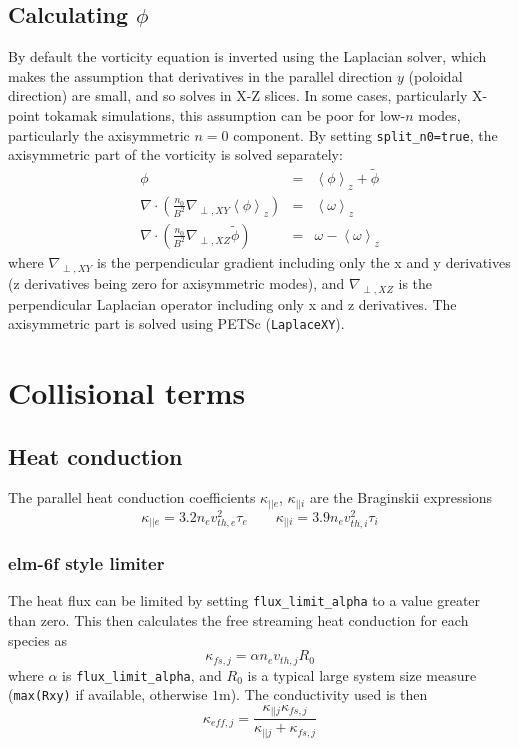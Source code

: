 \documentclass[12pt,a4paper]{article}
\begin{document}
\subsection{Calculating $\phi$}

By default the vorticity equation is inverted using the Laplacian solver, 
which makes the assumption that derivatives in the parallel direction $y$
(poloidal direction) are small, and so solves in X-Z slices. 
In some cases, particularly X-point tokamak simulations, this assumption
can be poor for low-$n$ modes, particularly the axisymmetric $n=0$ component.
By setting \texttt{split\_n0=true}, the axisymmetric part of the vorticity is solved separately:
\begin{eqnarray}
\phi &=& \left<\phi\right>_z + \tilde{\phi} \\
\nabla\cdot\left(\frac{n_0}{B^2}\nabla_{\perp, XY}\left<\phi\right>_z\right) &=& \left<\omega\right>_z \\
\nabla\cdot\left(\frac{n_0}{B^2}\nabla_{\perp, XZ}\tilde{\phi}\right) &=& \omega - \left<\omega\right>_z
\end{eqnarray}
where $\nabla_{\perp, XY}$ is the perpendicular gradient including only the x and y derivatives (z derivatives being zero for axisymmetric modes), 
and $\nabla_{\perp, XZ}$ is the perpendicular Laplacian operator including only x and z derivatives. The axisymmetric part is solved using PETSc
(\texttt{LaplaceXY}).

\section{Collisional terms}
\label{sec:collisional}

\subsection{Heat conduction}

The parallel heat conduction coefficients $\kappa_{||e}$, $\kappa_{||i}$ are
the Braginskii expressions
\begin{equation}
  \kappa_{||e} = 3.2n_ev_{th,e}^2 \tau_e \qquad \kappa_{||i} = 3.9n_ev_{th,i}^2 \tau_i
  \label{eq:kappa_sh}
\end{equation}

\subsubsection{elm-6f style limiter}

The heat flux can be limited by setting \texttt{flux\_limit\_alpha} to a value greater than zero. This then calculates the free streaming heat conduction for each species as
\begin{equation}
\kappa_{fs,j} = \alpha n_e v_{th,j} R_0
\end{equation}
where $\alpha$ is \texttt{flux\_limit\_alpha}, and $R_0$ is a typical large system size measure (\texttt{max(Rxy)} if available, otherwise $1$m). The conductivity used
is then
\begin{equation}
  \kappa_{eff,j} = \frac{\kappa_{||j}\kappa_{fs,j}}{\kappa_{||j} + \kappa_{fs,j}}
\end{equation}
\end{document}
